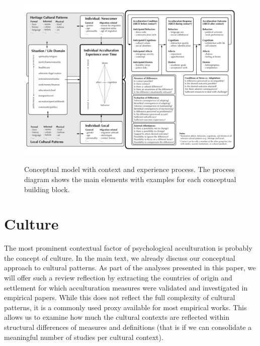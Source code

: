 \documentclass[man, 12pt, a4paper]{apa7}
\begin{document}
\begin{figure}
    \centering
    \caption{Conceptual model with context and experience process. The process diagram shows the main elements with examples for each conceptual building block.}
    \includegraphics[width=\textwidth]{../Figures/ConceptualFrameworkExpandedOptima_Revision.pdf}
    \label{fig:SupModelContext}
\end{figure}

\section{Culture} 
The most prominent contextual factor of psychological acculturation is probably the concept of culture. In the main text, we already discuss our conceptual approach to cultural patterns. As part of the analyses presented in this paper, we will offer such a review reflection by extracting the countries of origin and settlement for which acculturation measures were validated and investigated in empirical papers. While this does not reflect the full complexity of cultural patterns, it is a commonly used proxy available for most empirical works. This allows us to examine how much the cultural contexts are reflected within structural differences of measures and definitions (that is if we can consolidate a meaningful number of studies per cultural context).
\end{document}
